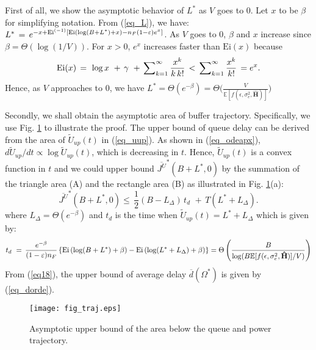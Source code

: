 \documentclass[11pt,journal, onecolumn]{./IEEEtran}
\newcommand{\red}{\color{black}}
\begin{document}
{\red First of all, we show the asymptotic behavior of $L^*$ as $V$ goes to 0.} Let $x$ to be $\beta$ for simplifying  notation. From (\ref{eq_L}), we have: ${L^*}\, = \,{e^{ - x + {\rm{E}}{{\rm{i}}^{( - 1)}}\left[ {{\rm{Ei}}\left( {\log (B + {L^*}) + x} \right) -  n_F(1-\varepsilon){e^x}} \right]}}$. As $V$ goes to 0, $\beta$ and $x$ increase since $\beta=\Theta(\log(1/V))$. For $x>0$, $e^x$ increases faster than $\mathrm{Ei}(x)$ because
\[{\rm{Ei}}(x)\, = \,\,\log x\,\, + \,\gamma \,\, + \,\sum\nolimits_{k = 1}^\infty  {\frac{{{x^k}}}{{k\,k!}}} \, < \,\sum\nolimits_{k = 1}^\infty  {\frac{{{x^k}}}{{k!}}} \, = {e^x}.\]
Hence, as $V$ approaches to 0, we have $L^* = \Theta\left( e^{-\beta}\right) = \Theta\Big(\frac{V}{{\mathbb{E}[ f(\epsilon,\sigma_e^2,\mathbf{\hat{H}})]}}\Big)$


{\red Secondly, we shall obtain the asymptotic area of buffer trajectory. Specifically, we use Fig. \ref{fig_traj} to illustrate the proof.} The upper bound of queue delay can be derived from the area of $\widetilde U_{up}(t)$ in (\ref{eq_uup}). As shown in (\ref{eq_odeapx}), $d\widetilde U_{up}/dt \propto \log \widetilde U_{up}(t)$, which is decreasing in $t$. Hence, $\widetilde U_{up}(t)$ is a convex function in $t$ and we could upper bound ${\overline {{J^U}} ^*}(B+L^* ,0)$ by the summation of the triangle area (A) and the rectangle area (B) as illustrated in Fig. \ref{fig_traj}(a):
\begin{equation}\label{eq18}
{\overline {{J^U}} ^*}(B+L^* ,0) \le \,\frac{1}{2}(B-L_{\Delta})\,{t_d}\,\, + \,T(L^*+L_\Delta).
\end{equation}
where $L_\Delta=\Theta(e^{-\beta})$ and $t_d$ is the time when $\widetilde U_{up}(t) = L^*+L_\Delta$ which is given by:
\[{t_d}\,\, = \,\frac{{{e^{ - \beta }}}}{{ (1 - {\varepsilon}){n_F}}}\left\{ {{\rm{Ei}}\left( {\log (B + {L^*}) + \beta} \right) - {\rm{Ei}}\left( {\log ({L^*} + {L_\Delta }) + \beta} \right)} \right\} = \Theta \left( {\frac{B}{{\log ({B }\mathbb{E}[ f(\epsilon,\sigma_e^2,\mathbf{\hat{H}})]/V)}}} \right)\]
From (\ref{eq18}), the upper bound of average delay $\overline d(\Omega^*)$ is given by (\ref{eq_dorde}).

\begin{figure}[t!]
\centering
\texttt{[image: fig\_traj.eps]}
\caption{Asymptotic upper bound of the area below the queue and power trajectory.} \label{fig_traj}
\end{figure}
\end{document}
